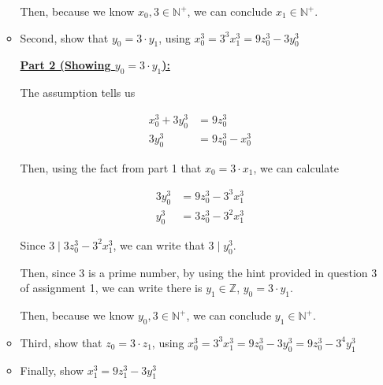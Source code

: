 \documentclass[12pt]{article}
\begin{document}
\begin{mdframed}
\begin{enumerate}[1.]
\begin{itemize}
\begin{mdframed}
            \bigskip

            Then, because we know $x_0, 3 \in \mathbb{N}^+$, we can conclude
            $x_1 \in \mathbb{N}^+$.

            \end{mdframed}

            \item Second, show that $y_0 = 3 \cdot y_1$, using $x_0^3 = 3^3 x_1^3 = 9z_0^3 - 3y_0^3$

            \begin{mdframed}
            \underline{\textbf{Part 2 (Showing $y_0 = 3 \cdot y_1$):}}

            \bigskip

            The assumption tells us

            \begin{align}
                x_0^3 + 3y_0^3 &= 9z_0^3\\
                3y_0^3 &= 9z_0^3 - x_0^3
            \end{align}

            \bigskip

            Then, using the fact from part 1 that $x_0 = 3 \cdot x_1$, we can calculate

            \begin{align}
                3y_0^3 &= 9z_0^3 - 3^3x_1^3\\
                y_0^3 &= 3z_0^3 - 3^2x_1^3
            \end{align}

            \bigskip

            Since $3 \mid 3z_0^3 - 3^2x_1^3$, we can write that $3 \mid y_0^3$.

            \bigskip

            Then, since 3 is a prime number, by using the hint provided in question 3
            of assignment 1, we can write there is $y_1 \in \mathbb{Z}$, $y_0 = 3 \cdot y_1$.

            \bigskip

            Then, because we know $y_0, 3 \in \mathbb{N}^+$, we can conclude
            $y_1 \in \mathbb{N}^+$.

            \end{mdframed}


            \item Third, show that $z_0 = 3 \cdot z_1$, using $x_0^3 = 3^3 x_1^3 = 9z_0^3 - 3y_0^3 =  9z_0^3 - 3^4y_1^3$
            \item Finally, show $x_1^3 = 9z_1^3 - 3y_1^3$
        \end{itemize}


\end{enumerate}
\end{mdframed}
\end{document}
